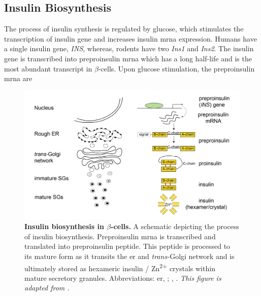 \subsection[Insulin Biosynthesis]{Insulin Biosynthesis} %
\label{sec:insbio}


  
The process of insulin synthesis is regulated by glucose, which stimulates the transcription of insulin gene and increases insulin \gls{mrna} expression. Humans have a single insulin gene, \textit{INS}, whereas, rodents have two \textit{Ins1} and \textit{Ins2}. The insulin gene is transcribed into preproinsulin \gls{mrna} which has a long half-life and is the most abundant transcript in $\beta$-cells. Upon glucose stimulation, the preproinsulin \gls{mrna} are 



\begin{figure}[H]
    \centering
    \includegraphics[width=\linewidth]{Chapter1/Fig/F1-9-01.png}
    \caption[Insulin biosynthesis in $\beta$-cells]{\textbf{Insulin biosynthesis in $\beta$-cells.} A schematic depicting the process of insulin biosynthesis. Preproinsulin \gls{mrna} is transcribed and translated into preproinsulin peptide. This peptide is processed to its mature form as it transits the \gls{er} and \textit{trans-}Golgi network and is ultimately stored as hexameric insulin / Zn\textsuperscript{2+} crystals within mature secretory granules. Abbreviations: \gls{er}, ; , . \textit{This figure is adapted from \textbf{\cite{tokarz_cell_2018}}.}}
    \label{fig:chp1_ins_bio}
\end{figure}




